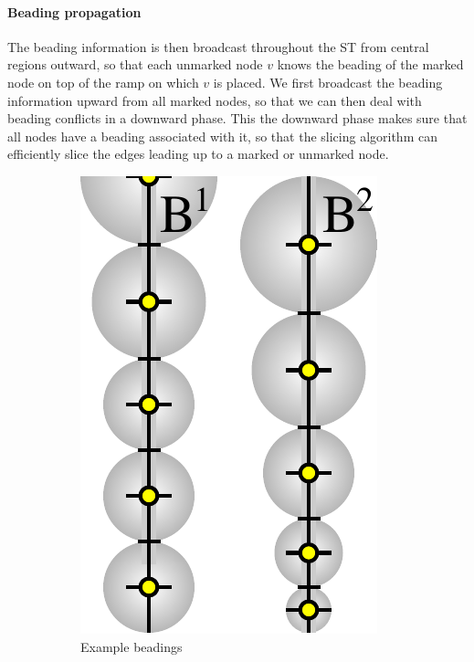 \paragraph{Beading propagation}
The beading information is then broadcast throughout the ST from central regions outward,
so that each unmarked node $v$ knows the beading of the marked node on top of the ramp on which $v$ is placed.
We first broadcast the beading information upward from all marked nodes,
so that we can then deal with beading conflicts in a downward phase.
This the downward phase makes sure that all nodes have a beading associated with it, so that the slicing algorithm can efficiently slice the edges leading up to a marked or unmarked node.	



\begin{figure}
\centering
\setlength{\figheight}{.29\columnwidth}
\begin{subfigure}{0.4\columnwidth}\centering
\includegraphics[height=\figheight]{sources-method-trapezoid-beading-interpolation-beading.pdf}
\caption{Example beadings}\label{example_beading}
\end{subfigure}
\begin{subfigure}{0.4\columnwidth}\centering

\end{subfigure}
\end{figure}
